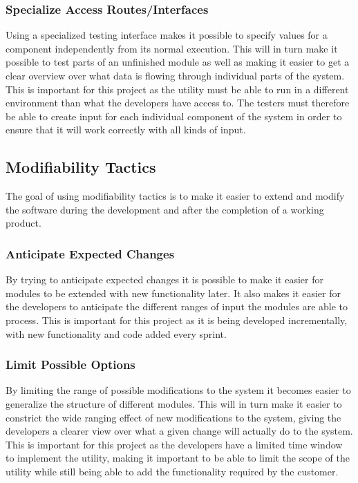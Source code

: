 \subsubsection{Specialize Access Routes/Interfaces}
Using a specialized testing interface makes it possible to specify values for a component independently from its normal execution. This will in turn make it possible to test parts of an unfinished module as well as making it easier to get a clear overview over what data is flowing through individual parts of the system. This is important for this project as the \gls{utility} must be able to run in a different environment than what the developers have access to. The testers must therefore be able to create input for each individual component of the system in order to ensure that it will work correctly with all kinds of input. 

\subsection{Modifiability Tactics}
The goal of using modifiability tactics is to make it easier to extend and modify the software during the development and after the completion of a working product.

\subsubsection{Anticipate Expected Changes}
By trying to anticipate expected changes it is possible to make it easier for modules to be extended with new functionality later. It also makes it easier for the developers to anticipate the different ranges of input the modules are able to process. This is important for this project as it is being developed incrementally, with new functionality and code added every sprint.

\subsubsection{Limit Possible Options}
By limiting the range of possible modifications to the system it becomes easier to generalize the structure of different modules. This will in turn make it easier to constrict the wide ranging effect of new modifications to the system, giving the developers a clearer view over what a given change will actually do to the system. This is important for this project as the developers have a limited time window to implement the \gls{utility}, making it important to be able to limit the scope of the \gls{utility} while still being able to add the functionality required by the customer.

